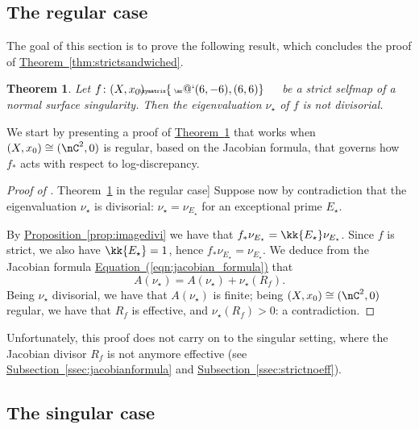 \documentclass[11 pt, twoside, a4paper]{amsart}
\makeatletter
\newcommand{\Kld}{{A}}
\newcommand{\selfarrow}[1][]{\tiny{\!\!\!\xymatrix{\phantom{|}\ar@`{(6,-6),(6,6)}}\hspace{4mm}}}
\newtheorem{thm}{Theorem}[section]
\theoremstyle{definition}
\theoremstyle{definition}
\newcommand{\JD}[1]{R_{#1}}
\newcommand{\refprop}[1]{\hyperref[prop:#1]{Proposition~\ref*{prop:#1}}}
\newcommand{\refthm}[1]{\hyperref[thm:#1]{Theorem~\ref*{thm:#1}}}
\newcommand{\refssec}[1]{\hyperref[ssec:#1]{Subsection~\ref*{ssec:#1}}}
\newcommand{\refeqn}[1]{\hyperref[eqn:#1]{Equation~(\ref*{eqn:#1})}}
\makeatother
\begin{document}
\subsection{The regular case}%

The goal of this section is to prove the following result, which concludes the proof of \refthm{strictsandwiched}.

\begin{thm}\label{thm:nustarnotdivisorial}
Let $f\colon(X,x_0) \selfarrow $ be a strict selfmap of a normal surface singularity.
Then the eigenvaluation $\nu_\star$ of $f$ is not divisorial.
\end{thm}

We start by presenting a proof of \refthm{nustarnotdivisorial} that works when $(X,x_0) \cong (\nC^2,0)$ is regular, based on the Jacobian formula, that governs how $f_*$ acts with respect to log-discrepancy.



\begin{proof}[Proof of \refthm{nustarnotdivisorial} in the regular case]
Suppose now by contradiction that the eigenvaluation $\nu_\star$ is divisorial: $\nu_\star = \nu_{E_\star}$ for an exceptional prime $E_\star$.

By \refprop{imagedivi} we have that $f_*\nu_{E_\star} = \kk{E_\star} \nu_{E_\star}$.
Since $f$ is strict, we also have $\kk{E_\star} = 1$, hence $f_*\nu_{E_\star} = \nu_{E_\star}$.
We deduce from the Jacobian formula \refeqn{jacobian_formula} that
\[
\Kld(\nu_\star) = \Kld(\nu_\star) + \nu_\star(\JD{f})\text{.}
\] 
Being $\nu_\star$ divisorial, we have that $\Kld(\nu_\star)$ is finite; being $(X,x_0) \cong (\nC^2,0)$ regular, we have that $\JD{f}$ is effective, and $\nu_\star(\JD{f})>0$: a contradiction.

\end{proof}

Unfortunately, this proof does not carry on to the singular setting, where the Jacobian divisor $\JD{f}$ is not anymore effective (see \refssec{jacobianformula} and \refssec{strictnoeff}).


\subsection{The singular case}
\end{document}
